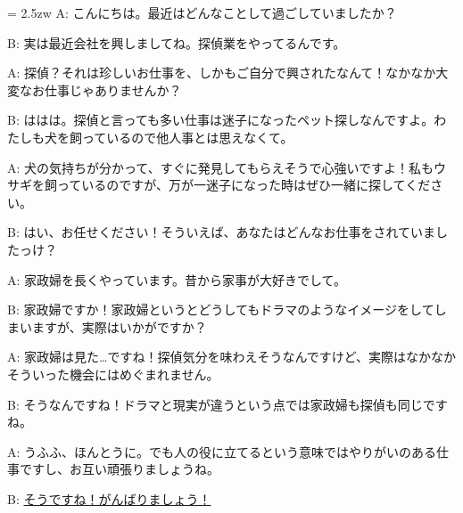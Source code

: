 \documentclass[11pt]{amsart}
\title{}
\author{}
\newenvironment{hangall}[1]{\hangindent = 2.5zw\everypar{\hangindent = 2.5zw}}{}
\begin{document}
\maketitle
\begin{hangall}{}%
A: こんにちは。最近はどんなことして過ごしていましたか？

B: 実は最近会社を興しましてね。探偵業をやってるんです。

A: 探偵？それは珍しいお仕事を、しかもご自分で興されたなんて！なかなか大変なお仕事じゃありませんか？

B: ははは。探偵と言っても多い仕事は迷子になったペット探しなんですよ。わたしも犬を飼っているので他人事とは思えなくて。

A: 犬の気持ちが分かって、すぐに発見してもらえそうで心強いですよ！私もウサギを飼っているのですが、万が一迷子になった時はぜひ一緒に探してください。

B: はい、お任せください！そういえば、あなたはどんなお仕事をされていましたっけ？

A: 家政婦を長くやっています。昔から家事が大好きでして。

B: 家政婦ですか！家政婦というとどうしてもドラマのようなイメージをしてしまいますが、実際はいかがですか？

A: 家政婦は見た…ですね！探偵気分を味わえそうなんですけど、実際はなかなかそういった機会にはめぐまれません。

B: そうなんですね！ドラマと現実が違うという点では家政婦も探偵も同じですね。

A: うふふ、ほんとうに。でも人の役に立てるという意味ではやりがいのある仕事ですし、お互い頑張りましょうね。

B: \ul{そうですね！がんばりましょう！}\end{hangall}
\end{document}
